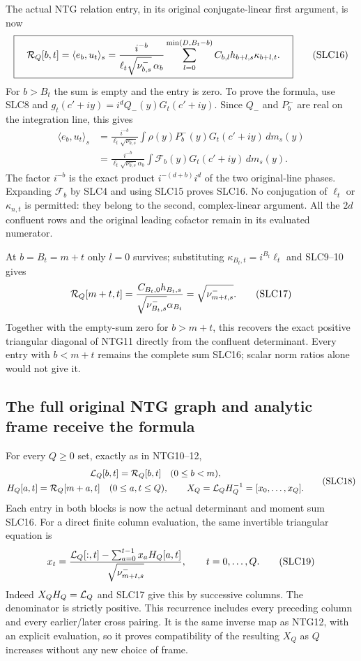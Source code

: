 \documentclass[11pt,a4paper]{article}
\begin{document}
The actual NTG relation entry, in its original
conjugate-linear first argument, is now
\[
 \boxed{\quad
 {\cal R}_Q[b,t]=\langle e_b,u_t\rangle_s
   =\frac{i^{-b}}{\ell_t\sqrt{\nu_{b,s}^-}\,\alpha_b}
       \sum_{l=0}^{\min(D,B_t-b)}
           C_{b,l}h_{b+l,s}\kappa_{b+l,t}.
 \quad}                                                        \tag{SLC16}
\]
For $b>B_t$ the sum is empty and the entry is zero.
To prove the formula, use SLC8 and
$g_t(c'+iy)=i^dQ_-(y)G_t(c'+iy)$. Since $Q_-$ and
$P_b^-$ are real on the integration line, this gives
\[
\begin{split}
 \langle e_b,u_t\rangle_s
 &=\frac{i^{-b}}{\ell_t\sqrt{\nu_{b,s}^-}}
           \int \rho(y)P_b^-(y)G_t(c'+iy)\,dm_s(y)\\
 &=\frac{i^{-b}}{\ell_t\sqrt{\nu_{b,s}^-}\alpha_b}
            \int \mathcal F_b(y)G_t(c'+iy)\,dm_s(y).
\end{split}
\]
The factor $i^{-b}$ is the exact product
$i^{-(d+b)}i^d$ of the two original-line phases.
Expanding $\mathcal F_b$ by SLC4 and using SLC15 proves SLC16.
No conjugation of $\ell_t$ or $\kappa_{n,t}$ is permitted:
they belong to the second, complex-linear argument.
All the $2d$ confluent rows and the original leading
cofactor remain in its evaluated numerator.

At $b=B_t=m+t$ only $l=0$ survives; substituting
$\kappa_{B_t,t}=i^{B_t}\ell_t$ and SLC9--10 gives
\[
 {\cal R}_Q[m+t,t]
       =\frac{C_{B_t,0}h_{B_t,s}}
                    {\sqrt{\nu_{B_t,s}^-}\alpha_{B_t}}
       =\sqrt{\nu_{m+t,s}^-}.
                                                               \tag{SLC17}
\]
Together with the empty-sum zero for $b>m+t$,
this recovers the exact positive triangular diagonal
of NTG11 directly from the confluent determinant.
Every entry with $b<m+t$ remains the complete sum
SLC16; scalar norm ratios alone would not give it.

\subsection{The full original NTG graph and analytic frame receive the formula}
For every $Q\ge0$ set, exactly as in NTG10--12,
\[
\begin{gathered}
 {\cal L}_Q[b,t]={\cal R}_Q[b,t]\quad(0\le b<m),\\
 H_Q[a,t]={\cal R}_Q[m+a,t]\quad(0\le a,t\le Q),\qquad
 X_Q={\cal L}_QH_Q^{-1}=[x_0,\ldots,x_Q].
\end{gathered}                                                    \tag{SLC18}
\]
Each entry in both blocks is now the actual determinant
and moment sum SLC16. For a direct finite column evaluation,
the same invertible triangular equation is
\[
 x_t=
 \frac{{\cal L}_Q[:,t]-\sum_{a=0}^{t-1}x_aH_Q[a,t]}
                    {\sqrt{\nu_{m+t,s}^-}},
                  \qquad t=0,\ldots,Q .
                                                               \tag{SLC19}
\]
Indeed $X_QH_Q={\cal L}_Q$ and SLC17 give this by
successive columns. The denominator is strictly positive.
This recurrence includes every preceding column and
every earlier/later cross pairing. It is the same
inverse map as NTG12, with an explicit evaluation,
so it proves compatibility of the resulting $X_Q$
as $Q$ increases without any new choice of frame.
\end{document}
